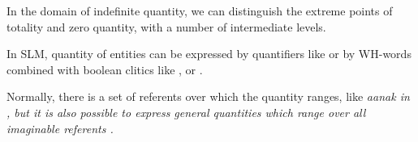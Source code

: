 %
%


In the domain of indefinite quantity, we can distinguish the extreme points of totality and zero quantity, with a number of intermediate levels.

In SLM, quantity of entities can be expressed by quantifiers like   or by WH-words combined with boolean clitics like ,   or  .

Normally, there is a set of referents over which the quantity ranges, like \em aanak \em in , but it is also possible to express general quantities which range over all imaginable referents .


